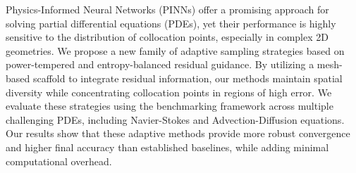 Physics-Informed Neural Networks (PINNs) offer a promising approach for solving partial differential equations (PDEs), yet their performance is highly sensitive to the distribution of collocation points, especially in complex 2D geometries. We propose a new family of adaptive sampling strategies based on power-tempered and entropy-balanced residual guidance. By utilizing a mesh-based scaffold to integrate residual information, our methods maintain spatial diversity while concentrating collocation points in regions of high error. We evaluate these strategies using the \pinnpoint benchmarking framework across multiple challenging PDEs, including Navier-Stokes and Advection-Diffusion equations. Our results show that these adaptive methods provide more robust convergence and higher final accuracy than established baselines, while adding minimal computational overhead.

